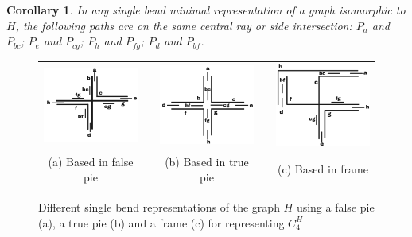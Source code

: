 \documentclass[
submission
]{dmtcs-episciences}
\newtheorem{corollary}[theorem]{Corollary}
\begin{document}
\begin{corollary} \label{coro:paresMesmoSegmento}
In any single bend minimal representation of a graph isomorphic to $H$, the following paths are on the same central ray or side intersection: $P_{a}$ and $P_{bc}$; $P_{e}$ and $P_{cg}$; $P_{h}$ and $P_{fg}$; $P_{d}$ and $P_{bf}$.

\end{corollary}

%
\begin{figure}[htb]
  \centering
  \begin{tabular}{c c c c c }
    \includegraphics[width=4cm]{falsePie}  %
    & &\includegraphics[width=4cm]{truePie} %
    & &
 \includegraphics[width=4cm]{frame} \\%
    {\footnotesize (a) Based in false pie}  & &  {\footnotesize(b) Based in true pie} & & {\footnotesize (c) Based in frame} %
  \end{tabular}
  \caption{Different single bend representations of the  graph $H$ using a false pie (a), a true pie (b) and a frame (c) for representing  $C_4^{H}$}\label{fig:falsepietruepieframe}
\end{figure} 
\end{document}
